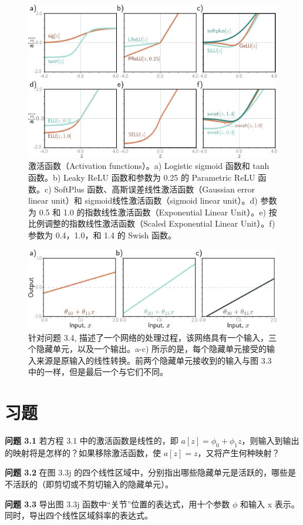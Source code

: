 \begin{figure}[ht!]
	\centering
	\includegraphics[width=0.7\linewidth]{png/chapter3/ShallowActivations.png}
\caption{激活函数（Activation functions）。a) Logistic sigmoid 函数和 tanh 函数。b) Leaky ReLU 函数和参数为 0.25 的 Parametric ReLU 函数。c) SoftPlus 函数、高斯误差线性激活函数（Gaussian error linear unit）和 sigmoid线性激活函数（sigmoid linear unit）。d) 参数为 0.5 和 1.0 的指数线性激活函数（Exponential Linear Unit）。e) 按比例调整的指数线性激活函数（Scaled Exponential Linear Unit）。f) 参数为 0.4，1.0，和 1.4 的 Swish 函数。}
\end{figure}

\begin{figure}[ht!]
	\centering
	\includegraphics[width=0.7\linewidth]{png/chapter3/ShallowChangeSlope.png}
\caption{针对问题 3.4, 描述了一个网络的处理过程，该网络具有一个输入，三个隐藏单元，以及一个输出。a-c) 所示的是，每个隐藏单元接受的输入来源是原输入的线性转换。前两个隐藏单元接收到的输入与图 3.3 中的一样，但是最后一个与它们不同。}
\end{figure}

\section{习题}
\textbf{问题 3.1} 若方程 3.1 中的激活函数是线性的，即 \(a[z] = \phi_0 + \phi_{1}z\)，则输入到输出的映射将是怎样的？如果移除激活函数，使 \(a[z] = z\)，又将产生何种映射？

\textbf{问题 3.2} 在图 3.3j 的四个线性区域中，分别指出哪些隐藏单元是活跃的，哪些是不活跃的（即剪切或不剪切输入的隐藏单元）。

\textbf{问题 3.3} 导出图 3.3j 函数中“关节”位置的表达式，用十个参数 \(\phi\) 和输入 x 表示。同时，导出四个线性区域斜率的表达式。

